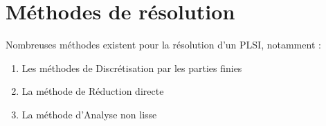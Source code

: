 \documentclass[11pt]{report}
\theoremstyle{styletheorem}
\theoremstyle{styledef}
\theoremstyle{remark}
\begin{document}





\section{Méthodes de résolution}
Nombreuses méthodes existent pour la résolution d'un PLSI, notamment : 
\begin{enumerate}
	\item Les méthodes de Discrétisation par les parties finies
	\item La méthode de Réduction directe
	\item La méthode d'Analyse non lisse
\end{enumerate}
\end{document}
